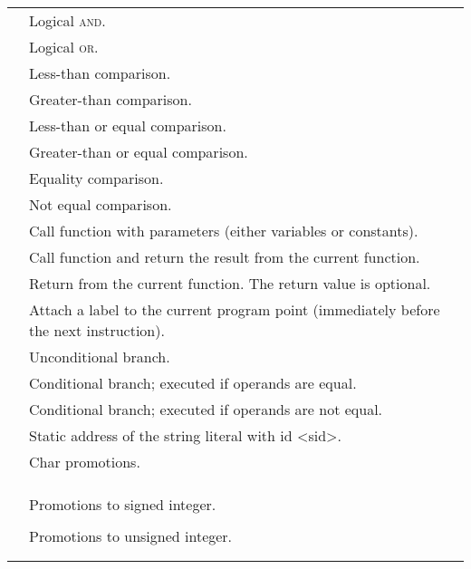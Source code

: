 \documentclass[../00-main.tex]{subfiles}
\begin{document}
\begin{xltabular}{\textwidth}{lX}
 & Logical \textsc{and}. \\
 & Logical \textsc{or}. \\
 & Less-than comparison. \\
 & Greater-than comparison. \\
 & Less-than or equal comparison. \\
 & Greater-than or equal comparison. \\
 & Equality comparison. \\
 & Not equal comparison. \\
\midrule
{} & Call function  with parameters  (either variables or constants). \\
 & Call function  and return the result from the current function. \\
 & Return from the current function. The return value  is optional. \\
\midrule
{} & Attach a label to the current program point (immediately before the next instruction). \\
 & Unconditional branch. \\
 & Conditional branch; executed if operands are equal. \\
 & Conditional branch; executed if operands are not equal. \\
\midrule
{} & Static address of the string literal with id <sid>. \\
\midrule
{} & Char promotions. \\
 &  \\
 &  \\
 &  \\
\midrule
{} & Promotions to signed integer. \\
 &  \\
\midrule
{} & Promotions to unsigned integer. \\
 &  \\
 &  \\

\end{xltabular}
\end{document}
